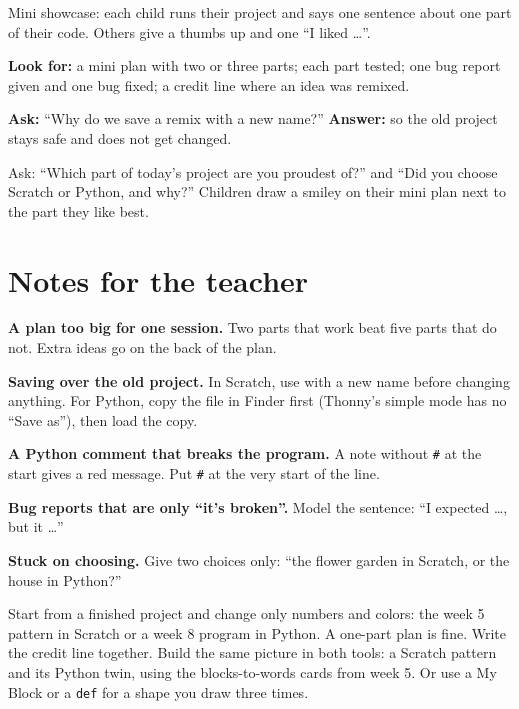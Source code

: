 \begin{teacherscript}
Mini showcase: each child runs their project and says one sentence about one part of their code. Others give a thumbs up and one \enquote{I liked \ldots}.
\end{teacherscript}

\begin{formativecheck}
\textbf{Look for:} a mini plan with two or three parts; each part tested; one bug report given and one bug fixed; a credit line where an idea was remixed.

\textbf{Ask:} \enquote{Why do we save a remix with a new name?}
\textbf{Answer:} so the old project stays safe and does not get changed.
\end{formativecheck}

\begin{reflection}
Ask: \enquote{Which part of today's project are you proudest of?} and \enquote{Did you choose Scratch or Python, and why?} Children draw a smiley on their mini plan next to the part they like best.
\end{reflection}

\section{Notes for the teacher}
\begin{commonmistakes}
  \item \textbf{A plan too big for one session.} Two parts that work beat five parts that do not. Extra ideas go on the back of the plan.
  \item \textbf{Saving over the old project.} In Scratch, use  with a new name before changing anything. For Python, copy the file in Finder first (Thonny's simple mode has no \enquote{Save as}), then load the copy.
  \item \textbf{A Python comment that breaks the program.} A note without \texttt{\#} at the start gives a red message. Put \texttt{\#} at the very start of the line.
  \item \textbf{Bug reports that are only \enquote{it's broken}.} Model the sentence: \enquote{I expected \ldots, but it \ldots}
  \item \textbf{Stuck on choosing.} Give two choices only: \enquote{the flower garden in Scratch, or the house in Python?}
\end{commonmistakes}

\begin{differentiation}
\supportpath Start from a finished project and change only numbers and colors: the week 5 pattern in Scratch or a week 8 program in Python. A one-part plan is fine. Write the credit line together.
\extensionpath Build the same picture in both tools: a Scratch pattern and its Python twin, using the blocks-to-words cards from week 5. Or use a My Block or a \texttt{def} for a shape you draw three times.
\end{differentiation}

